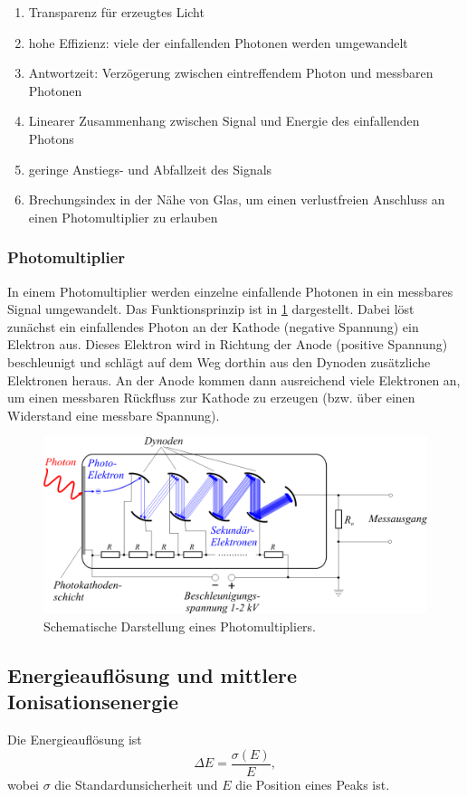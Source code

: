 \documentclass[
	a4paper,
	12pt,
	pagesize,
	ngerman
]{scrartcl}
\begin{document}
	\begin{enumerate}
		\item Transparenz für erzeugtes Licht
		\item hohe Effizienz: viele der einfallenden Photonen werden umgewandelt
		\item Antwortzeit: Verzögerung zwischen eintreffendem Photon und messbaren Photonen
		\item Linearer Zusammenhang zwischen Signal und Energie des einfallenden Photons
		\item geringe Anstiegs- und Abfallzeit des Signals
		\item Brechungsindex in der Nähe von Glas, um einen verlustfreien Anschluss an einen Photomultiplier zu erlauben
	\end{enumerate}

	\subsubsection{Photomultiplier}

	In einem Photomultiplier werden einzelne einfallende Photonen in ein messbares Signal umgewandelt.
	Das Funktionsprinzip ist in \cref{fig_Photomultiplier} dargestellt.
	Dabei löst zunächst ein einfallendes Photon an der Kathode (negative Spannung) ein Elektron aus.
	Dieses Elektron wird in Richtung der Anode (positive Spannung) beschleunigt und schlägt auf dem Weg dorthin aus den Dynoden zusätzliche Elektronen heraus.
	An der Anode kommen dann ausreichend viele Elektronen an, um einen messbaren Rückfluss zur Kathode zu erzeugen (bzw. über einen Widerstand eine messbare Spannung).

	\begin{figure}[H]
			\includegraphics[width=0.8\linewidth]{charts/Photomultiplier}
			\caption{
			Schematische Darstellung eines Photomultipliers.
			\cite{Photomultiplier}
			}
			\label{fig_Photomultiplier}
	\end{figure}

	\subsection{Energieauflösung und mittlere Ionisationsenergie}
	Die Energieauflösung ist
	\begin{equation}
		\Delta E = \frac{\sigma(E)}{E},
	\end{equation}
	wobei $\sigma$ die Standardunsicherheit und $E$ die Position eines Peaks ist.
\end{document}
